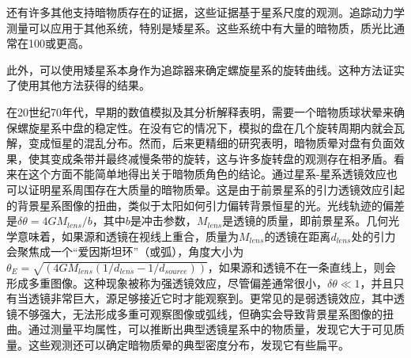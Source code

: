 

还有许多其他支持暗物质存在的证据，这些证据基于星系尺度的观测。追踪动力学测量可以应用于其他系统，特别是矮星系。这些系统中有大量的暗物质，质光比通常在100或更高。

此外，可以使用矮星系本身作为追踪器来确定螺旋星系的旋转曲线。这种方法证实了使用其他方法获得的结果。

在20世纪70年代，早期的数值模拟及其分析解释表明，需要一个暗物质球状晕来确保螺旋星系中盘的稳定性。在没有它的情况下，模拟的盘在几个旋转周期内就会瓦解，变成恒星的混乱分布。然而，后来更精细的研究表明，暗物质晕对盘有负面效果，使其变成条带并最终减慢条带的旋转，这与许多旋转盘的观测存在相矛盾。看来在这个方面不能简单地得出关于暗物质角色的结论。通过星系-星系透镜效应也可以证明星系周围存在大质量的暗物质晕。这是由于前景星系的引力透镜效应引起的背景星系图像的扭曲，类似于太阳如何引力偏转背景恒星的光。光线轨迹的偏差是$\delta \theta = 4GM_{lens}/b$，其中$b$是冲击参数，$M_{lens}$是透镜的质量，即前景星系。几何光学意味着，如果源和透镜在视线上重合，质量为$M_{lens}$的透镜在距离$d_{lens}$处的引力会聚焦成一个“爱因斯坦环”（或弧），角度大小为$\theta_E = \sqrt{(4GM_{lens}(1/d_{lens} - 1/d_{source}))}$，如果源和透镜不在一条直线上，则会形成多重图像。这种现象被称为强透镜效应，尽管偏差通常很小，$\delta\theta \ll 1$，并且只有当透镜非常巨大，源足够接近它时才能观察到。更常见的是弱透镜效应，其中透镜不够强大，无法形成多重可观察图像或弧线，但确实会导致背景星系图像的扭曲。通过测量平均属性，可以推断出典型透镜星系中的物质量，发现它大于可见质量。这些观测还可以确定暗物质晕的典型密度分布，发现它有些扁平。